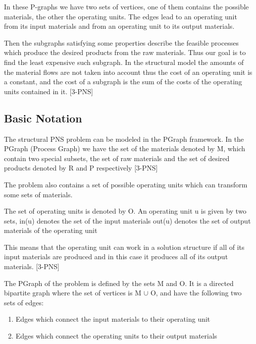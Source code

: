 In these P-graphs we have two sets of vertices, one of them contains the possible materials,
the other the operating units. The edges lead to an operating unit from its input materials 
and from an operating unit to its output materials. 


Then the subgraphs satisfying some properties describe the feasible processes
which produce the desired products from the raw materials.
Thus our goal is to find the least expensive such subgraph. 
In the structural model the amounts of the material flows are not taken into account 
thus the cost of an operating unit is a constant, and the cost of a subgraph 
is the sum of the costs of the operating units contained in it. [3-PNS]
\subsection{ Basic Notation }

The structural PNS problem can be modeled in the PGraph framework.
In the PGraph (Process Graph) we have the set of the materials denoted by M,
which contain two special subsets, the set of raw materials and the set of 
desired products denoted by R and P respectively [3-PNS]

The problem also contains a set of possible operating units which can transform some sets of materials. 

The set of operating units is denoted by O. An operating unit u is given by two sets, 
in(u) denotes the set of the input materials out(u) denotes the set of output materials of the operating unit

This means that the operating unit can work in a solution structure if all of its input materials are produced and in this case it 
produces all of its output materials. [3-PNS] 

The PGraph  of the problem is defined by the sets M and O. It is a directed bipartite graph where the set of vertices is M $\cup$ O, and have the following two sets of edges:
\begin{enumerate}
\item Edges which connect the input materials to their operating unit
\item Edges which connect the operating units to their output materials
\end{enumerate}

